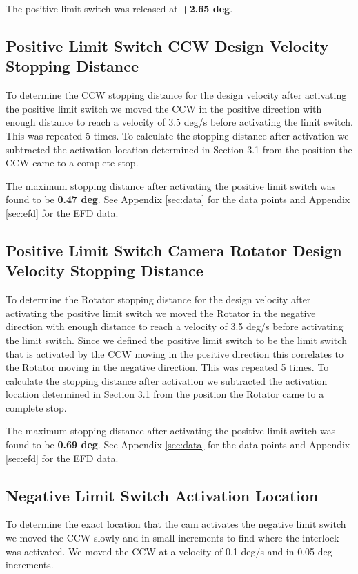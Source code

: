 \documentclass[SE,lsstdraft,authoryear,toc]{lsstdoc}
\begin{document}
The positive limit switch was released at \textbf{+2.65 deg}.

\subsection{Positive Limit Switch CCW Design Velocity Stopping Distance}

To determine the CCW stopping distance for the design velocity after
activating the positive limit switch we moved the CCW in the positive
direction with enough distance to reach a velocity of 3.5 deg/s before
activating the limit switch. This was repeated 5 times. To
calculate the stopping distance after activation we subtracted the
activation location determined in Section 3.1 from the position the CCW
came to a complete stop.

The maximum stopping distance after activating the positive limit switch
was found to be \textbf{0.47 deg}. See Appendix \ref{sec:data} for the data points
and Appendix \ref{sec:efd} for the EFD data.

\subsection{Positive Limit Switch Camera Rotator Design Velocity Stopping Distance}

To determine the Rotator stopping distance for the design velocity after
activating the positive limit switch we moved the Rotator in the
negative direction with enough distance to reach a velocity of 3.5 deg/s
before activating the limit switch. Since we defined the positive limit
switch to be the limit switch that is activated by the CCW moving in the
positive direction this correlates to the Rotator moving in the negative
direction. This was repeated 5 times. To calculate the stopping
distance after activation we subtracted the activation location
determined in Section 3.1 from the position the Rotator came to a
complete stop.

The maximum stopping distance after activating the positive limit switch
was found to be \textbf{0.69 deg}. See Appendix \ref{sec:data} for the data points
and Appendix \ref{sec:efd} for the EFD data.

\subsection{Negative Limit Switch Activation Location}

To determine the exact location that the cam activates the negative
limit switch we moved the CCW slowly and in small increments to find
where the interlock was activated. We moved the CCW at a velocity of 0.1
deg/s and in 0.05 deg increments.
\end{document}
